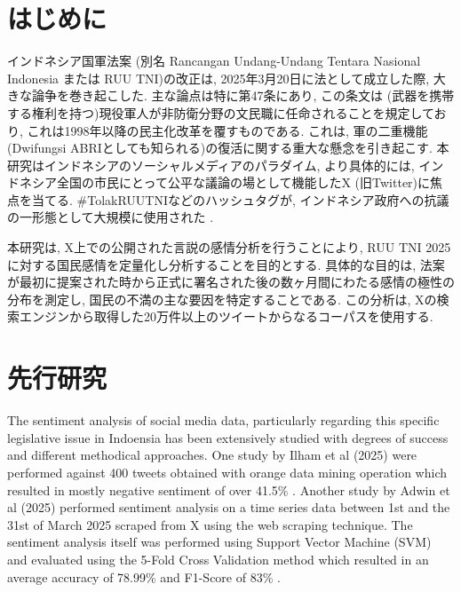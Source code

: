 \documentclass{jabstract}
\begin{document}
\maketitle

\begin{multicols}{2}
  
\section{はじめに}
インドネシア国軍法案 (別名 Rancangan Undang-Undang Tentara Nasional Indonesia または RUU TNI)の改正は, 2025年3月20日に法として成立した際, 大きな論争を巻き起こした. 主な論点は特に第47条にあり, この条文は (武器を携帯する権利を持つ)現役軍人が非防衛分野の文民職に任命されることを規定しており, これは1998年以降の民主化改革を覆すものである. これは, 軍の二重機能 (Dwifungsi ABRIとしても知られる)\cite{HRW2024}の復活に関する重大な懸念を引き起こす. 本研究はインドネシアのソーシャルメディアのパラダイム, より具体的には, インドネシア全国の市民にとって公平な議論の場として機能したX (旧Twitter)に焦点を当てる. \#TolakRUUTNIなどのハッシュタグが, インドネシア政府への抗議の一形態として大規模に使用された \cite{CNN2024}.

本研究は, X上での公開された言説の感情分析を行うことにより, RUU TNI 2025に対する国民感情を定量化し分析することを目的とする. 具体的な目的は, 法案が最初に提案された時から正式に署名された後の数ヶ月間にわたる感情の極性の分布を測定し, 国民の不満の主な要因を特定することである. この分析は, Xの検索エンジンから取得した20万件以上のツイートからなるコーパスを使用する.
\section{先行研究}
The sentiment analysis of social media data, particularly regarding this specific legislative issue in Indoensia has been extensively studied with degrees of success and different methodical approaches. One study by Ilham et al (2025) were performed against 400 tweets obtained with orange data mining operation which resulted in mostly negative sentiment of over 41.5\% \cite{Ilham2025}. Another study by Adwin et al (2025) performed sentiment analysis on a time series data between 1st and the 31st of March 2025 scraped from X using the web scraping technique. The sentiment analysis itself was performed using Support Vector Machine (SVM) and evaluated using the 5-Fold Cross Validation method which resulted in an average accuracy of 78.99\% and F1-Score of 83\% \cite{Nurhasananda_Akbar_2025}.


\end{multicols}
\end{document}
